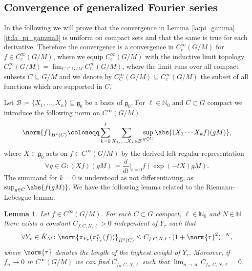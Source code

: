 \documentclass[JEP,XML,SOM,NoFloatCountersInSection,Unicode,published]{cedram}
\newtheorem{lemma}[theorem]{Lemma}
\theoremstyle{definition}
\DeclarePairedDelimiter{\abs}\lvert\rvert
\DeclarePairedDelimiter{\norm}\lVert\rVert
\renewcommand{\d}[1][t]{\ensuremath{\frac{d}{d#1}\Big|_{#1=0}}}
\newcommand{\sn}[3]{\ensuremath{\norm{#3}_{H^{#1}(#2)}}}
\newcommand{\mc}[1]{\ensuremath{\mathcal{#1}}}
\newcommand{\mf}[1]{\ensuremath{\mathfrak{#1}}}
\newcommand{\N}{\ensuremath{\mathbb{N}}}
\begin{document}
\subsection{Convergence of generalized Fourier series}
In the following we will prove that the convergence in Lemma \ref{la:pi_gamma}\,\eqref{it:la_pi_gamma3} is uniform on compact sets and that the same is true for each derivative. Therefore the convergence is a convergence in $C_c^\infty(G/M)$ for $f\in C_c^\infty(G/M)$, where we equip $C_c^\infty(G/M)$ with the inductive limit topology $C_c^\infty(G/M)=\lim_{C\subseteq G/M}C_C^\infty(G/M)$, where the limit runs over all compact subsets $C\subseteq G/M$ and we denote by $C_C^\infty(G/M)\subseteq C_c^\infty(G/M)$ the subset of all functions which are supported in $C$.

Let $\mc B\coloneqq\{X_1,\ldots,X_n\}\subseteq\mf g_0$ be a basis of $\mf g_0$. For $\ell\in\N_0$ and $C\subset G$ compact we introduce the following norm on $C^\infty(G/M)$
\[
\sn{\ell}{C}{f}\coloneqq\sum_{k=0}^\ell\sum_{X_1,\ldots,X_k\in\mc B}\sup_{g\in C}\abs{(X_1\cdots X_k f)(gM)},
\]
where $X\in\mf g_0$ acts on $f\in C^\infty(G/M)$ by the derived left regular representation
\[
\forall g\in G\colon(Xf)(gM)\coloneqq\d f(\exp(-tX)gM).
\]
The summand for $k=0$ is understood as not differentiating, \ie as $\sup_{g\in C}\abs{f(gM)}$. We have the following lemma related to the Riemann-Lebesgue lemma.

\begin{lemma}\label{la:fourier_conv}
Let $f\in C^\infty(G/M)$. For each $C\subset G$ compact, $\ell\in\N_0$ and $N\in\N$ there exists a constant $C_{f,C,N,\ell}>0$ independent of $Y_\tau$ such that
\[
\forall Y_\tau\in\hat K_M\colon\sn{\ell}{C}{\pi_{Y_\tau}(\pi_{Y_\tau}^*(f))}\leq C_{f,C,N,\ell}\cdot (1+\norm{\tau}^2)^{-N},
\]
where $\norm{\tau}$ denotes the length of the highest weight of $Y_\tau$. Moreover, if $f_n\to 0$ in $C^\infty(G/M)$ we can find $C_{f_n,C,N,\ell}$ such that $\lim_{n\to\infty}C_{f_n,C,N,\ell}=0$.
\end{lemma}
\end{document}
